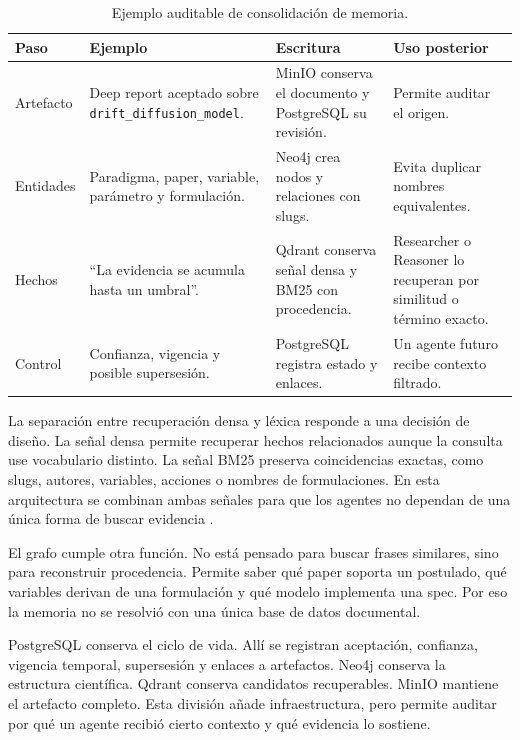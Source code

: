 \begin{table}[H]
\begin{center}
\scriptsize
\begin{tabular}{|p{2.6cm}|p{3.5cm}|p{3.4cm}|p{3.0cm}|} \hline
\textbf{Paso} & \textbf{Ejemplo} & \textbf{Escritura} & \textbf{Uso posterior} \\ \hline
Artefacto & Deep report aceptado sobre \texttt{drift\_diffusion\_model}. & MinIO conserva el documento y PostgreSQL su revisión. & Permite auditar el origen. \\ \hline
Entidades & Paradigma, paper, variable, parámetro y formulación. & Neo4j crea nodos y relaciones con slugs. & Evita duplicar nombres equivalentes. \\ \hline
Hechos & ``La evidencia se acumula hasta un umbral''. & Qdrant conserva señal densa y BM25 con procedencia. & Researcher o Reasoner lo recuperan por similitud o término exacto. \\ \hline
Control & Confianza, vigencia y posible supersesión. & PostgreSQL registra estado y enlaces. & Un agente futuro recibe contexto filtrado. \\ \hline
\end{tabular}
\caption{Ejemplo auditable de consolidación de memoria.}
\end{center}
\end{table}

La separación entre recuperación densa y léxica responde a una decisión de
diseño. La señal densa permite recuperar hechos relacionados aunque la consulta
use vocabulario distinto. La señal BM25 preserva coincidencias exactas, como
slugs, autores, variables, acciones o nombres de formulaciones. En esta
arquitectura se combinan ambas señales para que los agentes no dependan de una
única forma de buscar evidencia \cite{karpukhin2020dpr,robertson2009bm25}.

El grafo cumple otra función. No está pensado para buscar frases similares,
sino para reconstruir procedencia. Permite saber qué paper soporta un postulado,
qué variables derivan de una formulación y qué modelo implementa una spec. Por
eso la memoria no se resolvió con una única base de datos documental.

PostgreSQL conserva el ciclo de vida. Allí se registran aceptación, confianza,
vigencia temporal, supersesión y enlaces a artefactos. Neo4j conserva la
estructura científica. Qdrant conserva candidatos recuperables. MinIO mantiene
el artefacto completo. Esta división añade infraestructura, pero permite
auditar por qué un agente recibió cierto contexto y qué evidencia lo sostiene.


